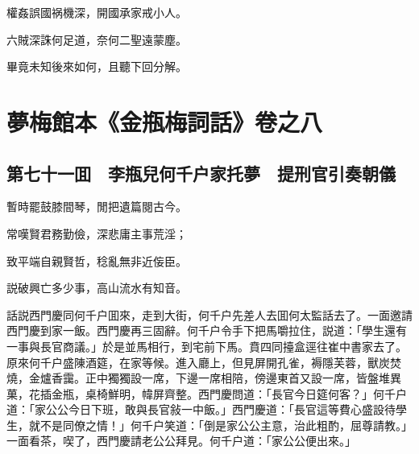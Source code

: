 權姦誤國祸機深，開國承家戒小人。

六賊深誅何足道，奈何二聖遠蒙塵。

畢竟未知後來如何，且聽下回分解。

\part*{夢梅館本《金瓶梅詞話》卷之八}

\chapter*{第七十一囬　李瓶兒何千户家托夢　提刑官引奏朝儀}

暫時罷鼓膝間琴，閒把遺篇閱古今。

常嘆賢君務勤儉，深悲庸主事荒淫；

致平端自親賢哲，稔亂無非近侫臣。

説破興亡多少事，高山流水有知音。

話説西門慶同何千户囬來，走到大街，何千户先差人去囬何太監話去了。一面邀請西門慶到家一飯。西門慶再三固辭。何千户令手下把馬嚼拉住，説道：「學生還有一事與長官商議。」於是並馬相行，到宅前下馬。賁四同擡盒逕往崔中書家去了。原來何千户盛陳酒筵，在家等候。進入廳上，但見屏開孔雀，褥隱芙蓉，獸炭焚燒，金爐香靄。正中獨獨設一席，下邊一席相陪，傍邊東首又設一席，皆盤堆異菓，花插金瓶，桌椅鮮明，幃屏齊整。西門慶問道：「長官今日筵何客？」何千户道：「家公公今日下班，敢與長官敍一中飯。」西門慶道：「長官這等費心盛設待學生，就不是同僚之情！」何千户笑道：「倒是家公公主意，治此粗酌，屈尊請教。」一面看茶，喫了，西門慶請老公公拜見。何千户道：「家公公便出來。」

